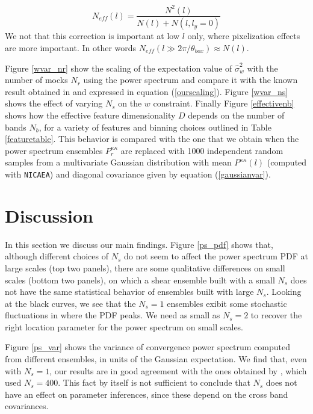 \documentclass[reprint,aps,prd,superscriptaddress,showkeys,showpacs]{revtex4-1}
\newcommand{\h}[1]{\hat{#1}}
\begin{document}
\begin{equation}
N_{eff}(l) = \frac{N^2(l)}{N(l)+N(l,l_y=0)}
\end{equation}
%
We not that this correction is important at low $l$ only, where pixelization effects are more important. In other words $N_{eff}(l\gg2\pi/\theta_{box})\approx N(l)$. 

Figure \ref{wvar_nr} show the scaling of the expectation value of $\h{\sigma}_w^2$ with the number of mocks $N_r$ using the power spectrum and compare it with the known result obtained in \citep{DodelsonSchneider13} and expressed in equation (\ref{ourscaling}). Figure \ref{wvar_ns} shows the effect of varying $N_s$ on the $w$ constraint. Finally Figure \ref{effectivenb} shows how the effective feature dimensionality $D$ depends on the number of bands $N_b$, for a variety of features and binning choices outlined in Table \ref{featuretable}. This behavior is compared with the one that we obtain when the power spectrum ensembles $P_r^{\kappa\kappa}$ are replaced with 1000 independent random samples from a multivariate Gaussian distribution with mean $P^{\kappa\kappa}(l)$ (computed with \texttt{NICAEA}) and diagonal covariance given by equation (\ref{gaussianvar}). 


\section{Discussion}

In this section we discuss our main findings. Figure \ref{ps_pdf} shows that, although different choices of $N_s$ do not seem to affect the power spectrum PDF at large scales (top two panels), there are some qualitative differences on small scales (bottom two panels), on which a shear ensemble built with a small $N_s$ does not have the same statistical behavior of ensembles built with large $N_s$. Looking at the black curves, we see that the $N_s=1$ ensembles exibit some stochastic fluctuations in where the PDF peaks. We need as small as $N_s=2$ to recover the right location parameter for the power spectrum on small scales. 

Figure \ref{ps_var} shows the variance of convergence power spectrum computed from different ensembles, in units of the Gaussian expectation. We find that, even with $N_s=1$, our results are in good agreement with the ones obtained by \citep{Sato12}, which used $N_s=400$. This fact by itself is not sufficient to conclude that $N_s$ does not have an effect on parameter inferences, since these depend on the cross band covariances. 
\end{document}
